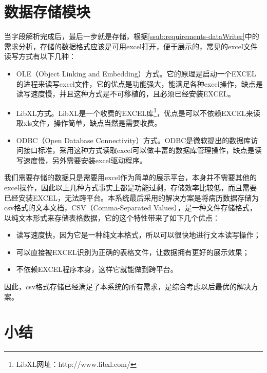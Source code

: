 \section{数据存储模块} %
当字段解析完成后，最后一步就是存储，根据\autoref{ssub:requirements-dataWriter}中的需求分析，存储的数据格式应该是可用excel打开，便于展示的，常见的excel文件读写方式有以下几种：
\begin{itemize}
	\item OLE（Object Linking and Embedding）方式。它的原理是启动一个EXCEL的进程来读写excel文件，它的优点是功能强大，能满足各种excel操作，缺点是读写速度慢，并且这种方式是不可移植的，且必须已经安装EXCEL。
	\item LibXL方式。LibXL是一个收费的EXCEL库\footnote{LibXL网址：http://www.libxl.com/}，优点是可以不依赖EXCEL来读取xls文件，操作简单，缺点当然是需要收费。
	\item ODBC（Open Database Connectivity）方式。ODBC是微软提出的数据库访问接口标准，采用这种方式读取excel可以做丰富的数据库管理操作，缺点是读写速度慢，另外需要安装excel驱动程序。
\end{itemize}
我们需要存储的数据只是需要用excel作为简单的展示平台，本身并不需要其他的excel操作，因此以上几种方式事实上都是功能过剩，存储效率比较低，而且需要已经安装EXCEL，无法跨平台。本系统最后采用的解决方案是将病历数据存储为csv格式的文本文档，CSV（Comma-Separated Values），是一种文件存储格式，以纯文本形式来存储表格数据，它的这个特性带来了如下几个优点：
\begin{itemize}
	\item 读写速度快，因为它是一种纯文本格式，所以可以很快地进行文本读写操作；
	\item 可以直接被EXCEL识别为正确的表格文件，让数据拥有更好的展示效果；
	\item 不依赖EXCEL程序本身，这样它就能做到跨平台。
\end{itemize}
因此，csv格式存储已经满足了本系统的所有需求，是综合考虑以后最优的解决方案。

\section{小结}

